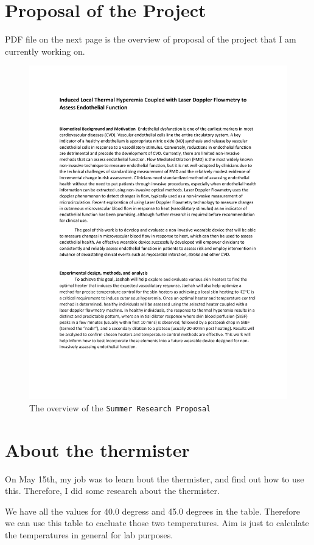 \documentclass{article}
\begin{document}
\section{Proposal of the Project}
PDF file on the next page is the overview of proposal of the project that I am currently working on.
\begin{figure}[htpb]
    \centering
    \includegraphics[width=1.1\textwidth]{Jaehah summer research proposal.pdf}
    \caption{The overview of the \texttt{Summer Research Proposal}}
    \label{fig:s_r}
\end{figure}

\section{About the thermister}
    On May 15th, my job was to learn bout the thermister, and find out how to use this.
Therefore, I did some research about the thermister.

We have all the values for 40.0 degress and 45.0 degrees in the table. 
Therefore we can use this table to cacluate those two temperatures. 
Aim is just to calculate the temperatures in general for lab purposes.
\end{document}
